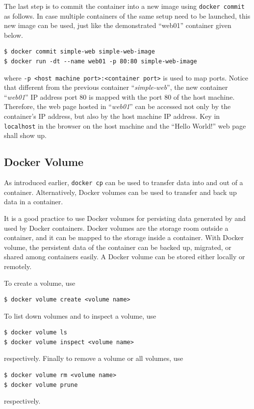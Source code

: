 The last step is to commit the container into a new image using \verb|docker commit| as follows. In case multiple containers of the same setup need to be launched, this new image can be used, just like the demonstrated ``web01'' container given below.
\begin{lstlisting}
$ docker commit simple-web simple-web-image
$ docker run -dt --name web01 -p 80:80 simple-web-image
\end{lstlisting}
where \verb|-p <host machine port>:<container port>| is used to map ports. Notice that different from the previous container ``\textit{simple-web}'', the new container ``\textit{web01}'' IP address port 80 is mapped with the port 80 of the host machine. Therefore, the web page hosted in ``\textit{web01}'' can be accessed not only by the container's IP address, but also by the host machine IP address. Key in \verb|localhost| in the browser on the host machine and the ``Hello World!'' web page shall show up.

\subsection{Docker Volume}

As introduced earlier, \verb|docker cp| can be used to transfer data into and out of a container. Alternatively, Docker volumes can be used to transfer and back up data in a container. 

It is a good practice to use Docker volumes for persisting data generated by and used by Docker containers. Docker volumes are the storage room outside a container, and it can be mapped to the storage inside a container. With Docker volume, the persistent data of the container can be backed up, migrated, or shared among containers easily. A Docker volume can be stored either locally or remotely.

To create a volume, use
\begin{lstlisting}
$ docker volume create <volume name>
\end{lstlisting}
To list down volumes and to inspect a volume, use
\begin{lstlisting}
$ docker volume ls
$ docker volume inspect <volume name>
\end{lstlisting}
respectively. Finally to remove a volume or all volumes, use
\begin{lstlisting}
$ docker volume rm <volume name>
$ docker volume prune
\end{lstlisting}
respectively.


